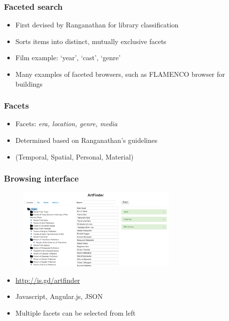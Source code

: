 \documentclass{beamer}
\begin{document}
\begin{frame}
    \frametitle{Faceted search}
        \begin{itemize}
            \item First devised by Ranganathan \cite{ranganathan} for library classification
            \item Sorts items into distinct, mutually exclusive facets
            \item Film example: `year', `cast', `genre'
            \item Many examples of faceted browsers, such as FLAMENCO browser for buildings \cite{hearst}
        \end{itemize}
\end{frame}

\begin{frame}
    \frametitle{Facets}
        \begin{itemize}
          \item Facets: \emph{era, location, genre, media}
            \item Determined based on Ranganathan's \cite{ranganathan} guidelines
            \item (Temporal, Spatial, Personal, Material)
        \end{itemize}
\end{frame}

\begin{frame}
    \frametitle{Browsing interface}
    \begin{figure}
        \centering
        \includegraphics[width=0.7\textwidth]{artfinder1.png}
    \end{figure}
        \begin{itemize}
            \item \url{http://is.gd/artfinder}
          \item Javascript, Angular.js, JSON
            \item Multiple facets can be selected from left
        \end{itemize}
\end{frame}
\end{document}
